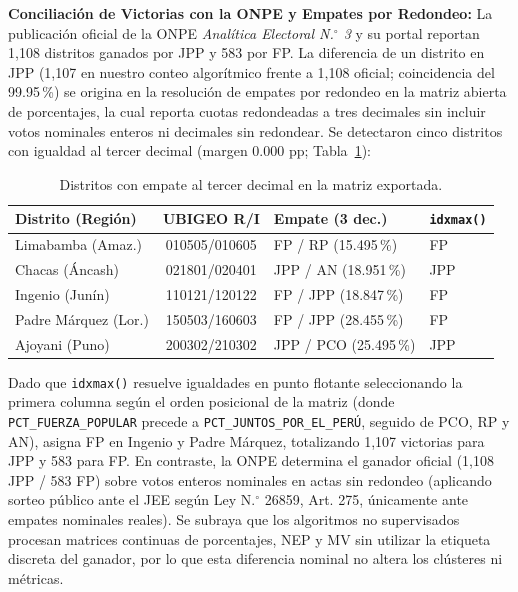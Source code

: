 \documentclass[conference,10pt,letterpaper]{IEEEtran}
\begin{document}
\textbf{Conciliación de Victorias con la ONPE y Empates por Redondeo:} La publicación oficial de la ONPE \textit{Analítica Electoral N.$^\circ$ 3} \cite{onpe2026_noticia1427006} y su portal \cite{onpe2026_resultados_web} reportan 1,108 distritos ganados por JPP y 583 por FP. La diferencia de un distrito en JPP (1,107 en nuestro conteo algorítmico frente a 1,108 oficial; coincidencia del 99.95\,\%) se origina en la resolución de empates por redondeo en la matriz abierta de porcentajes, la cual reporta cuotas redondeadas a tres decimales sin incluir votos nominales enteros ni decimales sin redondear. Se detectaron cinco distritos con igualdad al tercer decimal (margen 0.000 pp; Tabla~\ref{tab:empates}):

\begin{table}[htbp]
\centering
\caption{Distritos con empate al tercer decimal en la matriz exportada.}
\label{tab:empates}
\scriptsize
\begin{tabularx}{\columnwidth}{@{} l c l l @{}}
\toprule
\textbf{Distrito (Región)} & \textbf{UBIGEO R/I} & \textbf{Empate (3 dec.)} & \textbf{\texttt{idxmax()}} \\
\midrule
Limabamba (Amaz.) & 010505/010605 & FP / RP (15.495\,\%) & FP \\
Chacas (Áncash) & 021801/020401 & JPP / AN (18.951\,\%) & JPP \\
Ingenio (Junín) & 110121/120122 & FP / JPP (18.847\,\%) & FP \\
Padre Márquez (Lor.) & 150503/160603 & FP / JPP (28.455\,\%) & FP \\
Ajoyani (Puno) & 200302/210302 & JPP / PCO (25.495\,\%) & JPP \\
\bottomrule
\end{tabularx}
\end{table}

Dado que \texttt{idxmax()} resuelve igualdades en punto flotante seleccionando la primera columna según el orden posicional de la matriz (donde \texttt{PCT\_FUERZA\_POPULAR} precede a \texttt{PCT\_JUNTOS\_POR\_EL\_PERÚ}, seguido de PCO, RP y AN), asigna FP en Ingenio y Padre Márquez, totalizando 1,107 victorias para JPP y 583 para FP. En contraste, la ONPE determina el ganador oficial (1,108 JPP / 583 FP) sobre votos enteros nominales en actas sin redondeo (aplicando sorteo público ante el JEE según Ley N.$^\circ$ 26859, Art. 275, únicamente ante empates nominales reales). Se subraya que los algoritmos no supervisados procesan matrices continuas de porcentajes, NEP y MV sin utilizar la etiqueta discreta del ganador, por lo que esta diferencia nominal no altera los clústeres ni métricas.
\end{document}
